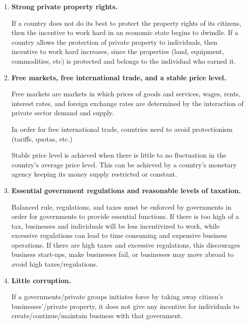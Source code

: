 \documentclass[a4paper, 12pt] {article}
\begin{document}
\begin{enumerate}
    \item \textbf{Strong private property rights.}

        If a country does not do its best to protect the property rights of its
        citizens, then the incentive to work hard in an economic state begins
        to dwindle. If a country allows the protection of private property to
        individuals, then incentive to work hard increases, since the properties
        (land, equipment, commodities, etc) is protected and belongs to the
        individual who earned it.

    \item \textbf{Free markets, free international trade, and a stable price level.}

        Free markets are markets in which prices of goods and services, wages, 
        rents, interest rates, and foreign exchange rates are determined by the
        interaction of private sector demand and supply.

        In order for free international trade, countries need to avoid protectionism
        (tariffs, quotas, etc.)

        Stable price level is achieved when there is little to no fluctuation
        in the country's average price level. This can be achieved by a country's
        monetary agency keeping its money supply restricted or constant.


    \item \textbf{Essential government regulations and reasonable levels of
        taxation.}

        Balanced rule, regulations, and taxes must be enforced by governments in
        order for governments to provide essential functions. If there is too 
        high of a tax, businesses and individuals will be less incentivized to
        work, while excessive regulations can lead to time consuming and 
        expensive business operations. If there are high taxes and excessive
        regulations, this discourages business start-ups, make businesses fail,
        or businesses may move abroad to avoid high taxes/regulations.

    \item \textbf{Little corruption.}

        If a governments/private groups initiates force by taking away citizen's
        businesses'/private property, it does not give any incentive for individuals
        to create/continue/maintain business with that government.
\end{enumerate}
\end{document}
